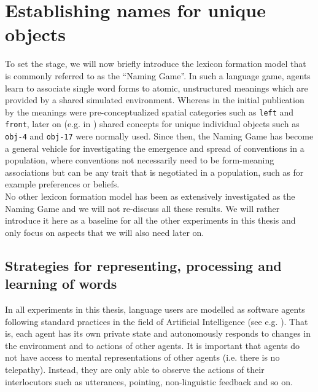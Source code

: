 
\setcounter{chapter}{3}

\chapter{Establishing names for unique objects}
\label{c:naming-game}

To set the stage, we will now briefly introduce the lexicon formation
model that is commonly referred to as the ``Naming Game''. In such a
language game, agents learn to associate single word forms to atomic,
unstructured meanings which are provided by a shared simulated
environment. Whereas in the initial publication by
\cite{steels95selforganizing} the meanings were pre-conceptualized
spatial categories such as \texttt{left} and \texttt{front}, later on
(e.g. in \citealp{steels99spatially}) shared concepts for unique
individual objects such as \texttt{obj-4} and \texttt{obj-17} were
normally used. Since then, the Naming Game has become a general
vehicle for investigating the emergence and spread of conventions in a
population, where conventions not necessarily need to be form-meaning
associations but can be any trait that is negotiated in a population,
such as for example preferences or beliefs.\\

\noindent No other lexicon formation model has been as extensively
investigated as the Naming Game and we will not re-discuss all these
results. We will rather introduce it here as a baseline for all the
other experiments in this thesis and only focus on aspects that we
will also need later on. 


\section{Strategies for representing, processing and
  learning of words}
\label{s:ng-strategies}

In all experiments in this thesis, language users are modelled as
software agents following standard practices in the field of
Artificial Intelligence (see
e.g. \citealp{wooldridge95intelligent}). That is, each agent has its
own private state and autonomously responds to changes in the
environment and to actions of other agents. It is important that
agents do not have access to mental representations of other agents
(i.e. there is no telepathy). Instead, they are only able to observe
the actions of their interlocutors such as utterances, pointing,
non-linguistic feedback and so on.

